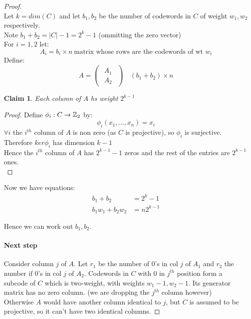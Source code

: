 \documentclass[]{article}
\newtheorem*{clm}{Claim}
\theoremstyle{definition}
\theoremstyle{remark}
\numberwithin{equation}{section}
\begin{document}
		\begin{proof}\hfill\\
			Let $k = dim(C)$ and let $b_1, b_2$ be the number of codewords in $C$ of weight $w_1, w_2$ respectively.\\
			Note $b_1 + b_2 = |C| - 1 = 2^k - 1$ (ommitting the zero vector)\\
			For $i = 1, 2$ let:
			\[
				A_i = b_i \times n\ \text{matrix whose rows are the codewords of wt $w_i$}
			\]
			Define:
			\[
				A = \begin{pmatrix}
					\begin{array}{cc}
					A_1\\ \hline
					A_2
					\end{array}
					\end{pmatrix} \quad (b_1 + b_2) \times n
			\]
			\begin{clm}
				Each column of $A$ hs weight $2^{k-1}$
			\end{clm}

			\begin{proof}
				Define $\phi_i : C \rightarrow \mathbb{Z}_2$ by:
				\[
					\phi_i(x_1,\hdots,x_n) = x_i
				\]
				$\forall i$ the $i^{th}$ column of $A$ is non zero (as $C$ is projective), so $\phi_i$ is surjective. Therefore $ker\phi_i$ has dimension $k-1$\\
				Hence the $i^{th}$ column of $A$ has $2^{k-1} - 1$ zeros and the rest of the entries are $2^{k-1}$ ones.\\
			\end{proof}

			Now we have equations:
			\begin{align*}
				b_1 + b_2 &= 2^k-1\\
				b_1w_1 + b_2 w_2 &= n2^{k-1}
			\end{align*}

			Hence we can work out $b_1, b_2$.
			\paragraph*{Next step}
				Consider column $j$ of $A$. Let $r_1$ be the number of 0's in col $j$ of $A_1$ and $r_2$ the number if 0's in col $j$ of $A_2$. Codewords in $C$ with 0 in $j^{th}$ position form a subcode of $C$ which is two-weight, with weights $w_1 -1, w_2 -1$. Its generator matrix has no zero column. (we are dropping the $j^{th}$ column however) \\
				Otherwise $A$ would have another column identical to $j$, but $C$ is assumed to be projective, so it can't have two identical columns.


\end{proof}
\end{document}
